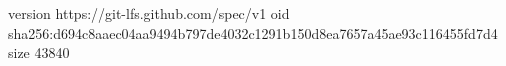 version https://git-lfs.github.com/spec/v1
oid sha256:d694c8aaec04aa9494b797de4032c1291b150d8ea7657a45ae93c116455fd7d4
size 43840

